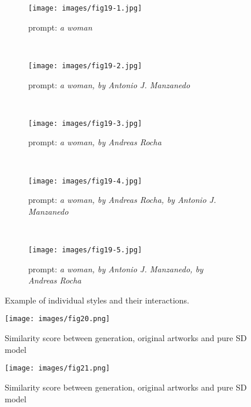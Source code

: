 \documentclass[12pt, letterpaper]{article}
\begin{document}
\begin{figure}[h]
    \centering

    \begin{subfigure}{0.8\textwidth}
        \centering
        \texttt{[image: images/fig19-1.jpg]}
        \caption{prompt: \textit{a woman}}
        \label{fig19:sub1}
    \end{subfigure}
    \\

    \begin{subfigure}{0.8\textwidth}
        \centering
        \texttt{[image: images/fig19-2.jpg]}
        \caption{prompt: \textit{a woman, by Antonio J. Manzanedo}}
        \label{fig19:sub2}
    \end{subfigure}
    \\
    
    \begin{subfigure}{0.8\textwidth}
        \centering
        \texttt{[image: images/fig19-3.jpg]}
        \caption{prompt: \textit{a woman, by Andreas Rocha}}
        \label{fig19:sub3}
    \end{subfigure}
    \\
    
    \begin{subfigure}{0.8\textwidth}
        \centering
        \texttt{[image: images/fig19-4.jpg]}
        \caption{prompt: \textit{a woman, by Andreas Rocha, by Antonio J. Manzanedo}}
        \label{fig19:sub4}
    \end{subfigure}
    \\
   
    \begin{subfigure}{0.8\textwidth}
        \centering
        \texttt{[image: images/fig19-5.jpg]}
        \caption{prompt: \textit{a woman, by Antonio J. Manzanedo, by Andreas Rocha}}
        \label{fig19:sub5}
    \end{subfigure}    

    \caption{Example of individual styles and their interactions.}
    \label{fig19:stacked_images}
\end{figure}

\begin{figure}[h]
    \centering
    \begin{minipage}{0.45\textwidth}
        \centering
        \texttt{[image: images/fig20.png]}
        \caption{Similarity score between generation, original artworks and pure SD model}
        \label{fig20:image1}
    \end{minipage}\hfill
    \begin{minipage}{0.45\textwidth}
        \centering
        \texttt{[image: images/fig21.png]}
        \caption{Similarity score between generation, original artworks and pure SD model}
        \label{fig21:image1}
    \end{minipage}
\end{figure}
\end{document}
